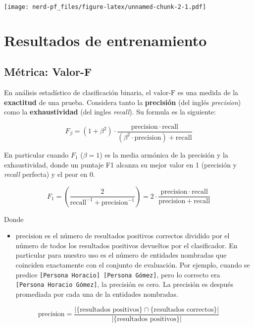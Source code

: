 \documentclass[12pt,a4paper,]{scrartcl}
\providecommand{\tightlist}{%
  \setlength{\itemsep}{0pt}\setlength{\parskip}{0pt}}
\begin{document}
\texttt{[image: nerd-pf\_files/figure-latex/unnamed-chunk-2-1.pdf]}

\newpage

\hypertarget{results}{%
\section{Resultados de entrenamiento}\label{results}}

\hypertarget{muxe9trica-valor-f}{%
\subsection{Métrica: Valor-F}\label{muxe9trica-valor-f}}

En análisis estadístico de clasificación binaria, el \(\text{valor-F}\) es una medida de la \textbf{exactitud} de una prueba.
Considera tanto la \textbf{precisión} (del inglés \emph{precision}) como la \textbf{exhaustividad} (del ingles \emph{recall}). Su formula es la siguiente:

\[
F_\beta = (1 + \beta^2) \cdot \frac{\mathrm{precision} \cdot \mathrm{recall}}{(\beta^2 \cdot \mathrm{precision}) + \mathrm{recall}}
\]

En particular cuando \(F_1\) (\(\beta = 1\)) es la media armónica de la precisión y la exhaustividad, donde un puntaje F1 alcanza su mejor valor en 1 (precisión y \emph{recall} perfecta) y el peor en 0.

\[
F_1 = \left(\frac{2}{\mathrm{recall}^{-1} + \mathrm{precision}^{-1}}\right) = 2 \cdot \frac{\mathrm{precision} \cdot \mathrm{recall}}{\mathrm{precision} + \mathrm{recall}}
\]

Donde

\begin{itemize}
\tightlist
\item
  \(\text{precision}\) es el número de resultados positivos correctos dividido por el número de todos los resultados positivos devueltos por el clasificador.
  En particular para nuestro uso es el número de entidades nombradas que coinciden exactamente con el conjunto de evaluación.
  Por ejemplo, cuando se predice \texttt{{[}Persona\ Horacio{]}\ {[}Persona\ Gómez{]}}, pero lo correcto era \texttt{{[}Persona\ Horacio\ Gómez{]}}, la precisión es cero. La precisión es después promediada por cada una de la entidades nombradas.
\end{itemize}

\[
\text{precision}=\frac{|\{\text{resultados positivos}\}\cap\{\text{resultados correctos}\}|}{|\{\text{resultados positivos}\}|}
\]
\end{document}
